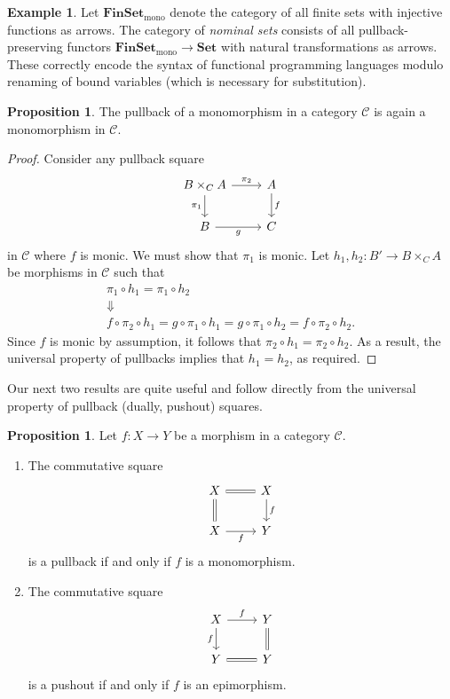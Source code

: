 \documentclass[10pt,letterpaper,cm]{nupset}
\theoremstyle{definition}
\newtheorem{exmp}[definition]{Example}
\theoremstyle{theorem}
\newtheorem{prop}[definition]{Proposition}
\theoremstyle{remark}
\newcommand{\1}{\mathbf{1}}
\renewcommand{\c}{\mathscr{C}}
\newcommand{\0}{\vec 0}
\begin{document}
\begin{exmp}
Let $\mathbf{FinSet}_{\mathrm{mono}}$ denote the category of all finite sets with injective functions as arrows. The category of \textit{nominal sets} consists of all pullback-preserving functors  $\mathbf{FinSet}_{\mathrm{mono}}\to \mathbf{Set}$ with natural transformations as arrows. These correctly encode the syntax of functional programming languages modulo renaming of bound variables (which is necessary for substitution).
\end{exmp}

\smallskip

\begin{prop}
The pullback of a monomorphism in a category $\c$ is again a monomorphism in $\c$.
\end{prop}
\begin{proof}
Consider any pullback square
\[
\begin{tikzcd}
B\times_C A \arrow[r, "\pi_2"] \arrow[d, "\pi_1"'] & A \arrow[d, "f"] \\
B \arrow[r, "g"']                                  & C               
\end{tikzcd}
\] in $\c$ where $f$ is monic. We must show that $\pi_1$ is monic. Let $h_1, h_2 : B' \to B\times_CA$ be morphisms in $\c$ such that 
\begin{gather*}
\pi_1 \circ h_1 = \pi_1 \circ h_2
\\ \Downarrow
\\ f\circ \pi_2 \circ h_1 = g\circ \pi_1 \circ h_1 = g\circ \pi_1 \circ h_2 = f\circ \pi_2 \circ h_2.
\end{gather*} Since $f$ is monic by assumption, it follows that $\pi_2 \circ h_1 = \pi_2 \circ h_2$. As a result, the universal property of pullbacks implies that $h_1 = h_2$, as required. 
\end{proof}

\smallskip

Our next two results are quite useful and follow directly from the universal property of pullback (dually, pushout) squares.

\begin{prop} Let $f: X \to Y$ be a morphism in a category $\c$.
\begin{enumerate}
\item  The commutative square
\[
\begin{tikzcd}
X \arrow[r, equal] \arrow[d, equal] & X \arrow[d, "f"] \\
X \arrow[r, "f"']     & Y               
\end{tikzcd}
\] is a pullback if and only if $f$ is a monomorphism.
\item The commutative square
\[
\begin{tikzcd}
X \arrow[d, "f"'] \arrow[r, "f"] & Y \arrow[d, equal] \\
Y \arrow[r, equal]                      & Y          
\end{tikzcd}
\] is a pushout if and only if $f$ is an epimorphism.
\end{enumerate}
\end{prop}
\end{document}

